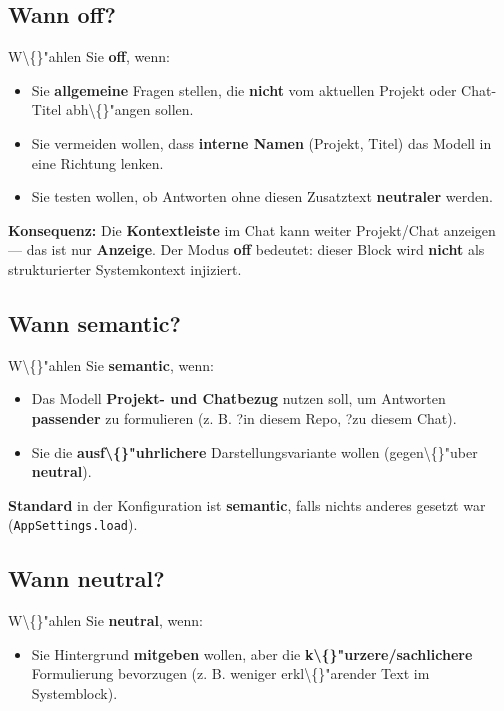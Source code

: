 \subsection{Wann \textbf{off}?}

W\textbackslash\{\}"ahlen Sie \textbf{off}, wenn:

\begin{itemize}
\item Sie \textbf{allgemeine} Fragen stellen, die \textbf{nicht} vom aktuellen Projekt oder Chat-Titel abh\textbackslash\{\}"angen sollen.
\item Sie vermeiden wollen, dass \textbf{interne Namen} (Projekt, Titel) das Modell in eine Richtung lenken.
\item Sie testen wollen, ob Antworten ohne diesen Zusatztext \textbf{neutraler} werden.
\end{itemize}

\textbf{Konsequenz:} Die \textbf{Kontextleiste} im Chat kann weiter Projekt/Chat anzeigen --- das ist nur \textbf{Anzeige}. Der Modus \textbf{off} bedeutet: dieser Block wird \textbf{nicht} als strukturierter Systemkontext injiziert.

\subsection{Wann \textbf{semantic}?}

W\textbackslash\{\}"ahlen Sie \textbf{semantic}, wenn:

\begin{itemize}
\item Das Modell \textbf{Projekt- und Chatbezug} nutzen soll, um Antworten \textbf{passender} zu formulieren (z. B. ?in diesem Repo\texttt{}, ?zu diesem Chat\texttt{}).
\item Sie die \textbf{ausf\textbackslash\{\}"uhrlichere} Darstellungsvariante wollen (gegen\textbackslash\{\}"uber \textbf{neutral}).
\end{itemize}

\textbf{Standard} in der Konfiguration ist \textbf{semantic}, falls nichts anderes gesetzt war (\texttt{AppSettings.load}).

\subsection{Wann \textbf{neutral}?}

W\textbackslash\{\}"ahlen Sie \textbf{neutral}, wenn:

\begin{itemize}
\item Sie Hintergrund \textbf{mitgeben} wollen, aber die \textbf{k\textbackslash\{\}"urzere/sachlichere} Formulierung bevorzugen (z. B. weniger erkl\textbackslash\{\}"arender Text im Systemblock).
\end{itemize}

